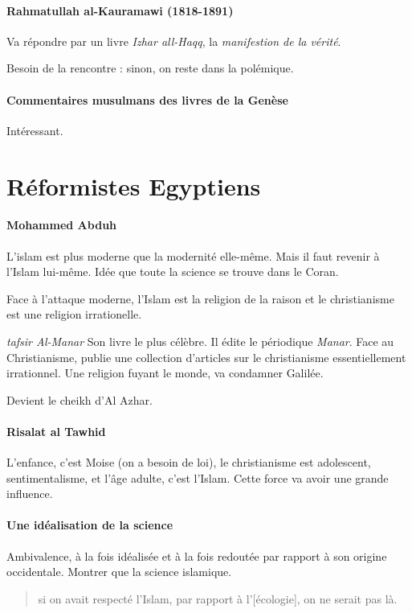 \paragraph{Rahmatullah al-Kauramawi (1818-1891)}  Va répondre par un livre \textit{Izhar all-Haqq}, la \textit{manifestion de la vérité}. 

\begin{Prop}
Besoin de la rencontre : sinon, on reste dans la polémique. 
\end{Prop}


\paragraph{Commentaires musulmans des livres de la Genèse} Intéressant. 

\section{Réformistes Egyptiens}


\paragraph{Mohammed Abduh} L'islam est plus moderne que la modernité elle-même. Mais il faut revenir à l'Islam lui-même. Idée que toute la science se trouve dans le Coran.

Face à l'attaque moderne, l'Islam est la religion de la raison et le christianisme est une religion irrationelle.

\textit{tafsir Al-Manar} Son livre le plus célèbre. Il édite le périodique \textit{Manar}.
Face au Christianisme, publie une collection d'articles sur le christianisme essentiellement irrationnel. Une religion fuyant le monde, va condamner Galilée.


Devient le cheikh d'Al Azhar.

\paragraph{Risalat al Tawhid} L'enfance, c'est Moise (on a besoin de loi), le christianisme est adolescent, sentimentalisme, et l'âge adulte, c'est l'Islam. Cette force va avoir une grande influence. 

\paragraph{Une idéalisation de la science} Ambivalence, à la fois idéalisée et à la fois redoutée par rapport à son origine occidentale. Montrer que la science islamique. 
\begin{quote}
    si on avait respecté l'Islam, par rapport à l'[écologie], on ne serait pas là.
\end{quote}

